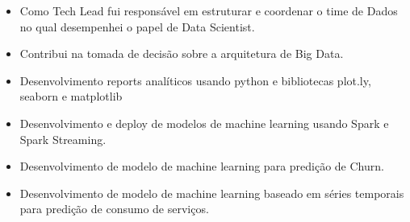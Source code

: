 \documentclass[10pt,a4paper,ragged2e]{altacv}
\begin{document}
\divider

\begin{itemize}

\item  Como Tech Lead fui responsável em estruturar e coordenar o time de Dados
       no qual desempenhei o papel de Data Scientist. 

\item  Contribui na tomada de decisão sobre a arquitetura de Big Data.

\item  Desenvolvimento reports analíticos usando python e bibliotecas plot.ly, seaborn e 
       matplotlib

\item  Desenvolvimento e deploy de modelos de machine learning usando Spark 
       e Spark Streaming.

\item  Desenvolvimento de modelo de machine learning para predição de Churn.

\item  Desenvolvimento de modelo de machine learning baseado em séries temporais 
       para predição de consumo de serviços.



\end{itemize}



\divider





\clearpage
\end{document}
